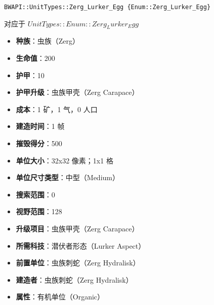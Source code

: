 \begin{tcolorbox}[colback=white, colframe=black!60!white, title=Zerg\_Lurker\_Egg(), arc=0mm]
    \begin{verbatim}
BWAPI::UnitTypes::Zerg_Lurker_Egg {Enum::Zerg_Lurker_Egg}
    \end{verbatim}
    对应于  $ UnitTypes::Enum::Zerg_Lurker_Egg $ 
    \begin{itemize}
        \item \textbf{种族}：虫族（Zerg）
        \item \textbf{生命值}：200
        \item \textbf{护甲}：10
        \item \textbf{护甲升级}：虫族甲壳（Zerg Carapace）
        \item \textbf{成本}：1 矿，1 气，0 人口
        \item \textbf{建造时间}：1 帧
        \item \textbf{摧毁得分}：500
        \item \textbf{单位大小}：32x32 像素；1x1 格
        \item \textbf{单位尺寸类型}：中型（Medium）
        \item \textbf{搜索范围}：0
        \item \textbf{视野范围}：128
        \item \textbf{升级项目}：虫族甲壳（Zerg Carapace）
        \item \textbf{所需科技}：潜伏者形态（Lurker Aspect）
        \item \textbf{前置单位}：虫族刺蛇（Zerg Hydralisk）
        \item \textbf{建造者}：虫族刺蛇（Zerg Hydralisk）
        \item \textbf{属性}：有机单位（Organic）
    \end{itemize}
\end{tcolorbox}


